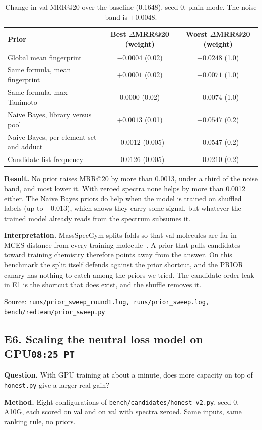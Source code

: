 \documentclass[11pt]{article}
\newcommand{\entry}[2]{\subsection*{#1\hfill{\normalfont\small\texttt{#2}}}}
\newcommand{\src}[1]{{\small\color{black!60}Source: \texttt{#1}}}
\begin{document}
\begin{table}[h]
\centering
\small
\begin{tabular}{lcc}
\toprule
Prior & Best $\Delta$MRR@20 (weight) & Worst $\Delta$MRR@20 (weight) \\
\midrule
Global mean fingerprint & $-0.0004$ (0.02) & $-0.0248$ (1.0) \\
Same formula, mean fingerprint & $+0.0001$ (0.02) & $-0.0071$ (1.0) \\
Same formula, max Tanimoto & $0.0000$ (0.02) & $-0.0074$ (1.0) \\
Naive Bayes, library versus pool & $+0.0013$ (0.01) & $-0.0547$ (0.2) \\
Naive Bayes, per element set and adduct & $+0.0012$ (0.005) & $-0.0547$ (0.2) \\
Candidate list frequency & $-0.0126$ (0.005) & $-0.0210$ (0.2) \\
\bottomrule
\end{tabular}
\caption{Change in val MRR@20 over the baseline (0.1648), seed 0, plain mode. The noise band is $\pm 0.0048$.}
\end{table}

\textbf{Result.} No prior raises MRR@20 by more than 0.0013, under a third of the noise band, and most lower it.
With zeroed spectra none helps by more than 0.0012 either. The Naive Bayes priors do help when the model is trained on shuffled labels
(up to $+0.013$), which shows they carry some signal, but whatever the trained model already reads from the spectrum
subsumes it.

\textbf{Interpretation.} MassSpecGym splits folds so that val molecules are far in MCES distance from every training
molecule~\cite{msg}. A prior that pulls candidates toward training chemistry therefore points away from the answer.
On this benchmark the split itself defends against the prior shortcut, and the PRIOR canary has nothing to catch among
the priors we tried. The candidate order leak in E1 is the shortcut that does exist, and the shuffle removes it.

\src{runs/prior\_sweep\_round1.log, runs/prior\_sweep.log, bench/redteam/prior\_sweep.py}

\entry{E6. Scaling the neutral loss model on GPU}{08:25 PT}

\textbf{Question.} With GPU training at about a minute, does more capacity on top of \texttt{honest.py} give a larger
real gain?

\textbf{Method.} Eight configurations of \texttt{bench/candidates/honest\_v2.py}, seed 0, A10G, each scored on val and
on val with spectra zeroed. Same inputs, same ranking rule, no priors.
\end{document}
